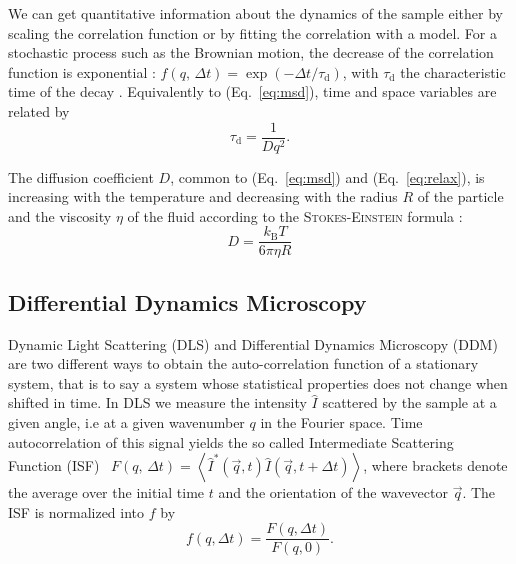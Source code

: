 \documentclass[%
 aip,
 jmp,%
 amsmath,amssymb,
reprint,%
]{revtex4-1}
\begin{document}
We can get quantitative information about the dynamics of the sample either by scaling the correlation function or by fitting the correlation with a model. For a stochastic process such as the Brownian motion, the decrease of the correlation function is exponential : $f(q, \, \Delta t) = \exp(-\Delta t/\tau_\text{d})$, with $\tau_\text{d}$ the characteristic time of the decay \citep{8_berne2000dynamic}. Equivalently to (Eq.~\ref{eq:msd}), time and space variables are related by
\begin{equation}
\tau_\text{d} = \frac{1}{Dq^2}.
\label{eq:relax}
\end{equation}

The diffusion coefficient $D$, common to (Eq.~\ref{eq:msd}) and (Eq.~\ref{eq:relax}), is increasing with the temperature and decreasing with the radius $R$ of the particle and the viscosity $\eta$ of the fluid according to the \textsc{Stokes-Einstein} formula \citep{9_einstein1906theory}:
\begin{equation}
D = \frac{k_\text{B} T}{6 \pi \eta R}
\end{equation}

\subsection{Differential Dynamics Microscopy}

Dynamic Light Scattering (DLS) and Differential Dynamics Microscopy (DDM) are two different ways to obtain the auto-correlation function of a stationary system, that is to say a system whose statistical properties does not change when shifted in time. In DLS we measure the intensity $\hat{I}$ scattered by the sample at a given angle, i.e at a given wavenumber $q$ in the Fourier space. Time autocorrelation of this signal yields the so called Intermediate Scattering Function (ISF)~\citep{19_goodman2005introduction} $F(q, \, \Delta t) = \left\langle \hat{I}^*(\vec{q}, t) \hat{I}(\vec{q}, t+\Delta t) \right\rangle$, where brackets denote the average over the initial time $t$ and the orientation of the wavevector $\vec{q}$. The ISF is normalized into $f$ by
\begin{equation}
f(q, \Delta t) = \frac{F(q, \Delta t)}{F(q, 0)}.
\end{equation}
\end{document}
